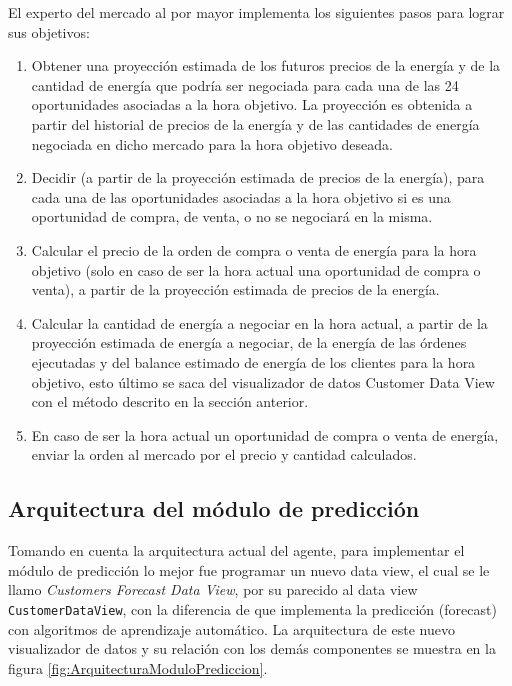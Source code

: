 El experto del mercado al por mayor implementa los siguientes pasos para lograr sus objetivos:

\renewcommand{\labelenumi}{\arabic{enumi}$)$}

\begin{enumerate}
	\item Obtener una proyección estimada de los futuros precios de la energía y de la cantidad de energía que podría ser negociada para cada una de las 24 oportunidades asociadas a la
hora objetivo. La proyección es obtenida a partir del historial de precios de la energía y
de las cantidades de energía negociada en dicho mercado para la hora objetivo deseada.
	\item Decidir (a partir de la proyección estimada de precios de la energía), para cada una de las oportunidades asociadas a la hora objetivo si es una oportunidad de compra, de venta, o
no se negociará en la misma.
	\item Calcular el precio de la orden de compra o venta de energía para la hora objetivo (solo en caso de ser la hora actual una oportunidad de compra o venta), a partir de la proyección estimada de precios de la energía.
	\item Calcular la cantidad de energía a negociar en la hora actual, a partir de la proyección estimada de energía a negociar, de la energía de las órdenes ejecutadas y del balance estimado de energía de los clientes para la hora objetivo, esto último se saca del visualizador de datos Customer Data View con el método descrito en la sección anterior.
	\item En caso de ser la hora actual un oportunidad de compra o venta de energía, enviar la
orden al mercado por el precio y cantidad calculados.
\end{enumerate}


\subsection{Arquitectura del módulo de predicción} \label{subsection:arquitecturaModuloPred}
Tomando en cuenta la arquitectura actual del agente, para implementar el módulo de predicción lo mejor fue programar un nuevo data view, el cual se le llamo \textit{Customers Forecast Data View}, por su parecido al data view  \texttt{CustomerDataView}, con la diferencia de que implementa la predicción (forecast) con algoritmos de aprendizaje automático. La arquitectura de este nuevo visualizador de datos y su relación con los demás componentes se muestra en la figura \ref{fig:ArquitecturaModuloPrediccion}.

